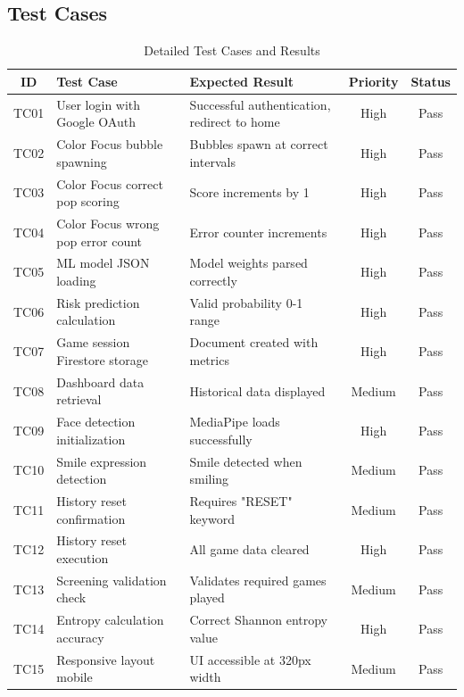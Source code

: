 \documentclass[12pt,letterpaper]{article}
\begin{document}
\subsection{Test Cases}

\begin{table}[H]
\centering
\small
\begin{tabular}{|c|p{4.5cm}|p{4cm}|c|c|}
\hline
\textbf{ID} & \textbf{Test Case} & \textbf{Expected Result} & \textbf{Priority} & \textbf{Status} \\
\hline
TC01 & User login with Google OAuth & Successful authentication, redirect to home & High & Pass \\
\hline
TC02 & Color Focus bubble spawning & Bubbles spawn at correct intervals & High & Pass \\
\hline
TC03 & Color Focus correct pop scoring & Score increments by 1 & High & Pass \\
\hline
TC04 & Color Focus wrong pop error count & Error counter increments & High & Pass \\
\hline
TC05 & ML model JSON loading & Model weights parsed correctly & High & Pass \\
\hline
TC06 & Risk prediction calculation & Valid probability 0-1 range & High & Pass \\
\hline
TC07 & Game session Firestore storage & Document created with metrics & High & Pass \\
\hline
TC08 & Dashboard data retrieval & Historical data displayed & Medium & Pass \\
\hline
TC09 & Face detection initialization & MediaPipe loads successfully & High & Pass \\
\hline
TC10 & Smile expression detection & Smile detected when smiling & Medium & Pass \\
\hline
TC11 & History reset confirmation & Requires "RESET" keyword & Medium & Pass \\
\hline
TC12 & History reset execution & All game data cleared & High & Pass \\
\hline
TC13 & Screening validation check & Validates required games played & Medium & Pass \\
\hline
TC14 & Entropy calculation accuracy & Correct Shannon entropy value & High & Pass \\
\hline
TC15 & Responsive layout mobile & UI accessible at 320px width & Medium & Pass \\
\hline
\end{tabular}
\caption{Detailed Test Cases and Results}
\end{table}
\end{document}
